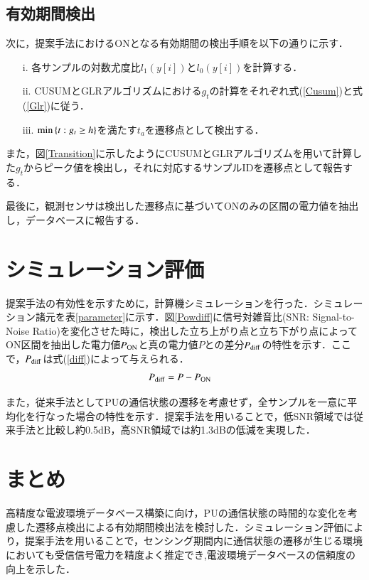 \documentclass[10pt, twocolumn, a4j]{jsarticle}
\begin{document}
\subsection{有効期間検出}
次に，提案手法におけるONとなる有効期間の検出手順を以下の通りに示す．
\begin{itemize}
 \item[i.] 各サンプルの対数尤度比$l_1(y[i])$と$l_0(y[i])$を計算する．
 \item[ii.] CUSUMとGLRアルゴリズムにおける$g_t$の計算をそれぞれ式(\ref{Cusum})と式(\ref{Glr})に従う．
 \item[iii.] ${\rm min}\left\{t:g_t\geq h\right\}$を満たす$t_a$を遷移点として検出する．
\end{itemize}
また，図\ref{Transition}に示したようにCUSUMとGLRアルゴリズムを用いて計算した$g_t$からピーク値を検出し，それに対応するサンプルIDを遷移点として報告する．

最後に，観測センサは検出した遷移点に基づいてONのみの区間の電力値を抽出し，データベースに報告する．
\section{シミュレーション評価}
提案手法の有効性を示すために，計算機シミュレーションを行った．シミュレーション諸元を表\ref{parameter}に示す．図\ref{Powdiff}に信号対雑音比(SNR: Signal-to-Noise Ratio)を変化させた時に，検出した立ち上がり点と立ち下がり点によってON区間を抽出した電力値$P_{{\rm ON}}$と真の電力値$P$との差分$P_{{\rm diff}}$の特性を示す．ここで，$P_{{\rm diff}}$は式(\ref{diff})によって与えられる．
\begin{eqnarray}
P_{{\rm diff}} &= P-P_{{\rm ON}}
\label{diff}
\end{eqnarray}

また，従来手法としてPUの通信状態の遷移を考慮せず，全サンプルを一意に平均化を行なった場合の特性を示す．提案手法を用いることで，低SNR領域では従来手法と比較し約0.5{\rm dB}，高SNR領域では約1.3{\rm dB}の低減を実現した．



\section{まとめ}
 高精度な電波環境データベース構築に向け，PUの通信状態の時間的な変化を考慮した遷移点検出による有効期間検出法を検討した．シミュレーション評価により，提案手法を用いることで，センシング期間内に通信状態の遷移が生じる環境においても受信信号電力を精度よく推定でき,電波環境データベースの信頼度の向上を示した．
\end{document}
